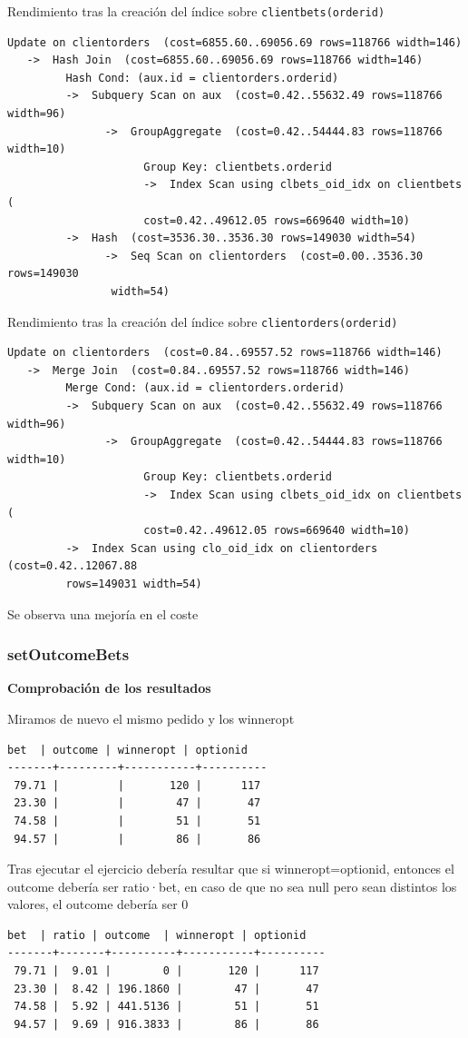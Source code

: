 \documentclass{article}
\begin{document}
Rendimiento tras la creación del índice sobre \texttt{clientbets(orderid)}
\begin{lstlisting}[style=sql]
 Update on clientorders  (cost=6855.60..69056.69 rows=118766 width=146)
   ->  Hash Join  (cost=6855.60..69056.69 rows=118766 width=146)
         Hash Cond: (aux.id = clientorders.orderid)
         ->  Subquery Scan on aux  (cost=0.42..55632.49 rows=118766 width=96)
               ->  GroupAggregate  (cost=0.42..54444.83 rows=118766 width=10)
                     Group Key: clientbets.orderid
                     ->  Index Scan using clbets_oid_idx on clientbets  (
                     cost=0.42..49612.05 rows=669640 width=10)
         ->  Hash  (cost=3536.30..3536.30 rows=149030 width=54)
               ->  Seq Scan on clientorders  (cost=0.00..3536.30 rows=149030
                width=54)
\end{lstlisting}

Rendimiento tras la creación del índice sobre \texttt{clientorders(orderid)}
\begin{lstlisting}[style=sql]
 Update on clientorders  (cost=0.84..69557.52 rows=118766 width=146)
   ->  Merge Join  (cost=0.84..69557.52 rows=118766 width=146)
         Merge Cond: (aux.id = clientorders.orderid)
         ->  Subquery Scan on aux  (cost=0.42..55632.49 rows=118766 width=96)
               ->  GroupAggregate  (cost=0.42..54444.83 rows=118766 width=10)
                     Group Key: clientbets.orderid
                     ->  Index Scan using clbets_oid_idx on clientbets  (
                     cost=0.42..49612.05 rows=669640 width=10)
         ->  Index Scan using clo_oid_idx on clientorders  (cost=0.42..12067.88 
         rows=149031 width=54)

\end{lstlisting}

Se observa una mejoría en el coste %

\subsubsection{setOutcomeBets}

\textbf{Comprobación de los resultados}

Miramos de nuevo el mismo pedido y los winneropt
\begin{lstlisting}[style=sql]
  bet  | outcome | winneropt | optionid
-------+---------+-----------+----------
 79.71 |         |       120 |      117
 23.30 |         |        47 |       47
 74.58 |         |        51 |       51
 94.57 |         |        86 |       86
 \end{lstlisting}
Tras ejecutar el ejercicio debería resultar que si winneropt=optionid, entonces el outcome debería ser ratio·bet, en caso de que no sea null pero sean distintos los valores, el outcome debería ser 0
\begin{lstlisting}[style=sql]
  bet  | ratio | outcome  | winneropt | optionid
-------+-------+----------+-----------+----------
 79.71 |  9.01 |        0 |       120 |      117
 23.30 |  8.42 | 196.1860 |        47 |       47
 74.58 |  5.92 | 441.5136 |        51 |       51
 94.57 |  9.69 | 916.3833 |        86 |       86
 \end{lstlisting}
\end{document}
